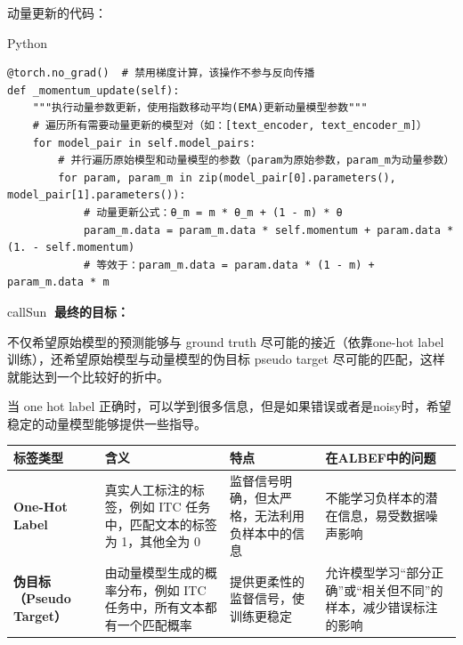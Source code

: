 \documentclass[zihao=false,fontset=windows]{ctexart}
\begin{document}
动量更新的代码：\par
\begin{feishucode}
{\small\ttfamily\color{feishuGray}Python}\par\vspace{-0.15em}
\begin{lstlisting}
@torch.no_grad()  # 禁用梯度计算，该操作不参与反向传播
def _momentum_update(self):
    """执行动量参数更新，使用指数移动平均(EMA)更新动量模型参数"""
    # 遍历所有需要动量更新的模型对（如：[text_encoder, text_encoder_m]）
    for model_pair in self.model_pairs:           
        # 并行遍历原始模型和动量模型的参数（param为原始参数，param_m为动量参数）
        for param, param_m in zip(model_pair[0].parameters(), model_pair[1].parameters()):
            # 动量更新公式：θ_m = m * θ_m + (1 - m) * θ
            param_m.data = param_m.data * self.momentum + param.data * (1. - self.momentum)
            # 等效于：param_m.data = param.data * (1 - m) + param_m.data * m
\end{lstlisting}
\end{feishucode}
\vspace{0.45em}
\begin{feishubox}{callSun}{🌟}
\colorbox{feishuPinkBg}{\textbf{最终的目标：}}\par
不仅希望原始模型的预测能够与 ground truth 尽可能的接近（依靠one-hot label训练），还希望原始模型与动量模型的伪目标 pseudo target 尽可能的匹配，这样就能达到一个比较好的折中。\par
当 one hot label 正确时，可以学到很多信息，但是如果错误或者是noisy时，希望稳定的动量模型能够提供一些指导。\par
\end{feishubox}
\vspace{0.45em}
\begin{center}
\renewcommand{\arraystretch}{1.35}
\begin{tabularx}{\textwidth}{|X|X|X|X|}
\hline
\rowcolor{tableHead} \textbf{\textbf{标签类型}} & \textbf{\textbf{含义}} & \textbf{\textbf{特点}} & \textbf{\textbf{在ALBEF中的问题}} \\ \hline
\textbf{One-Hot Label}  & 真实人工标注的标签，例如 ITC 任务中，匹配文本的标签为 1，其他全为 0 & 监督信号明确，但太严格，无法利用负样本中的信息 & 不能学习负样本的潜在信息，易受数据噪声影响 \\ \hline
\textbf{伪目标（Pseudo Target）}  & 由动量模型生成的概率分布，例如 ITC 任务中，所有文本都有一个匹配概率 & 提供更柔性的监督信号，使训练更稳定 & 允许模型学习“部分正确”或“相关但不同”的样本，减少错误标注的影响 \\ \hline
\end{tabularx}
\end{center}
\end{document}
